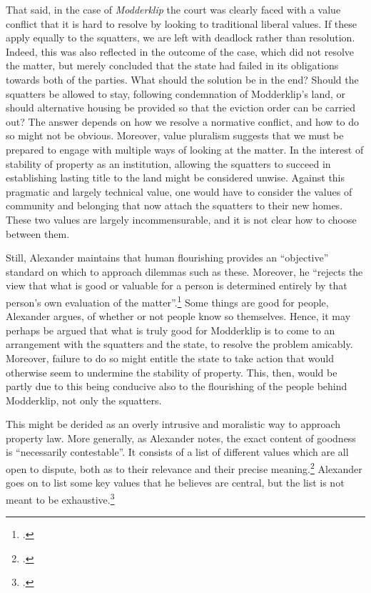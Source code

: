 {That said, in the case of {\it Modderklip} the court was clearly faced with a value conflict that it is hard to resolve by looking to traditional liberal values. If these apply equally to the squatters, we are left with deadlock rather than resolution. Indeed, this was also reflected in the outcome of the case, which did not resolve the matter, but merely concluded that the state had failed in its obligations towards both of the parties. What should the solution be in the end? Should the squatters be allowed to stay, following condemnation of Modderklip's land, or should alternative housing be provided so that the eviction order can be carried out? The answer depends on how we resolve a normative conflict, and how to do so might not be obvious. Moreover, value pluralism suggests that we must be prepared to engage with multiple ways of looking at the matter. In the interest of stability of property as an institution, allowing the squatters to succeed in establishing lasting title to the land might be considered unwise. Against this pragmatic and largely technical value, one would have to consider the values of community and belonging that now attach the squatters to their new homes. These two values are largely incommensurable, and it is not clear how to choose between them.

Still, Alexander maintains that human flourishing provides an ``objective'' standard on which to approach dilemmas such as these. Moreover, he ``rejects the view that what is good or valuable for a person is determined entirely by that person's own evaluation of the matter''.\footcite[1263]{alexander14} Some things are good for people, Alexander argues,  of whether or not people know so themselves. Hence, it may perhaps be argued that what is truly good for Modderklip is to come to an arrangement with the squatters and the state, to resolve the problem amicably. Moreover, failure to do so might entitle the state to take action that would otherwise seem to undermine the stability of property. This, then, would be partly due to this being conducive also to the flourishing of the people behind Modderklip, not only the squatters.

This might be derided as an overly intrusive and moralistic way to approach property law. More generally, as Alexander notes, the exact content of goodness is ``necessarily contestable''. It consists of a list of different values which are all open to dispute, both as to their relevance and their precise meaning.\footcite[1263]{alexander14} Alexander goes on to list some key values that he believes are central, but the list is not meant to be exhaustive.\footcite[1764-1776]{alexander14}




}
